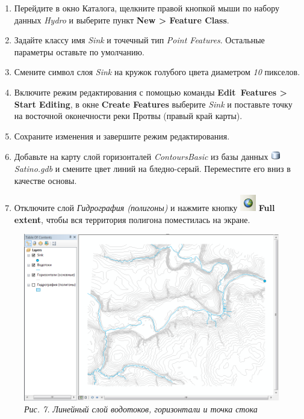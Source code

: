 \documentclass[12pt,]{book}
\begin{document}
\begin{enumerate}
\def\labelenumi{\arabic{enumi}.}
\item
  Перейдите в окно Каталога, щелкните правой кнопкой мыши по набору данных \emph{Hydro} и выберите пункт \textbf{New \textgreater{} Feature Class}.
\item
  Задайте классу имя \emph{Sink} и точечный тип \emph{Point Features}. Остальные параметры оставьте по умолчанию.
\item
  Смените символ слоя \emph{Sink} на кружок голубого цвета диаметром \emph{10} пикселов.
\item
  Включите режим редактирования с помощью команды \textbf{Edit~Features \textgreater{} Start Editing}, в окне \textbf{Create Features} выберите \emph{Sink} и поставьте точку на восточной оконечности реки Протвы (правый край карты).
\item
  Сохраните изменения и завершите режим редактирования.
\item
  Добавьте на карту слой горизонталей \emph{ContoursBasic} из базы данных \includegraphics{images/Ex13/image5.png} \emph{Satino.gdb} и смените цвет линий на бледно-серый. Переместите его вниз в качестве основы.
\item
  Отключите слой \emph{Гидрография (полигоны)} и нажмите кнопку \includegraphics{images/Ex13/image14.png} \textbf{Full extent}, чтобы вся территория полигона поместилась на экране.
\end{enumerate}

\begin{figure}
\centering
\includegraphics{images/Ex13/image19.png}
\caption{\emph{Рис. 7. Линейный слой водотоков, горизонтали и точка стока}}
\end{figure}
\end{document}

